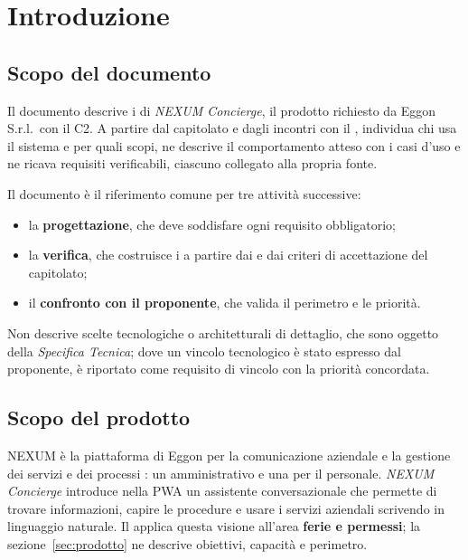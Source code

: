 \documentclass[documento]{gpt}
\begin{document}
\section{Introduzione}

\subsection{Scopo del documento}
Il documento descrive i  di \textit{NEXUM Concierge},
il prodotto richiesto da Eggon S.r.l.\ con il  C2. A partire
dal capitolato e dagli incontri con il , individua chi usa il
sistema e per quali scopi, ne descrive il comportamento atteso con i casi
d'uso e ne ricava requisiti verificabili, ciascuno collegato alla propria
fonte.

Il documento è il riferimento comune per tre attività successive:
\begin{itemize}
  \item la \textbf{progettazione}, che deve soddisfare ogni requisito
        obbligatorio;
  \item la \textbf{verifica}, che costruisce i  a partire
        dai  e dai criteri di accettazione del capitolato;
  \item il \textbf{confronto con il proponente}, che valida il perimetro e le
        priorità.
\end{itemize}
Non descrive scelte tecnologiche o architetturali di dettaglio, che sono
oggetto della \textit{Specifica Tecnica}; dove un vincolo tecnologico è stato
espresso dal proponente, è riportato come requisito di vincolo con la priorità
concordata.

\subsection{Scopo del prodotto}
NEXUM è la piattaforma di Eggon per la comunicazione aziendale e la gestione dei
servizi e dei processi : un  amministrativo e una  per il
personale. \textit{NEXUM Concierge} introduce nella PWA un assistente
conversazionale che permette di trovare informazioni, capire le procedure e
usare i servizi aziendali scrivendo in linguaggio naturale. Il  applica
questa visione all'area \textbf{ferie e permessi}; la sezione~\ref{sec:prodotto}
ne descrive obiettivi, capacità e perimetro.
\end{document}
